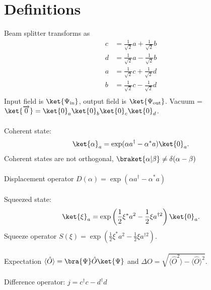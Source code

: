 \cite{Steinlechner2015}
\section{Definitions}
Beam splitter transforms as
\begin{align}
c & = \frac{1}{\sqrt{2}}a + \frac{1}{\sqrt{2}}b\\
d & = \frac{1}{\sqrt{2}}a - \frac{1}{\sqrt{2}}b\\
a &= \frac{1}{\sqrt{2}}c + \frac{1}{\sqrt{2}}d\\
b &= \frac{1}{\sqrt{2}}c - \frac{1}{\sqrt{2}}d\\
\end{align}
Input field is $\ket{\Psi_{\rm{in}}}$, output field is $\ket{\Psi_{\rm{out}}}$. Vacuum = $\ket{\overrightarrow{0}} = \ket{0}_a\ket{0}_b\ket{0}_c\ket{0}_d$. 
\paragraph{}
Coherent state:
\begin{equation}
	\ket{\alpha}_a = \exp(\alpha a^\dagger - \alpha^*a)\ket{0}_a.
\end{equation}
Coherent states are not orthogonal, $\braket{\alpha|\beta} \not= \delta(\alpha-\beta)$
\paragraph{}
Displacement operator $D(\alpha)= \exp\left(\alpha a^\dagger - \alpha^*a\right)$ 
\paragraph{}
Squeezed state:
\begin{equation}
\ket{\xi}_a = \exp\left(\frac{1}{2}\xi^* a^2 - \frac{1}{2}\xi a^{\dagger 2} \right)\ket{0}_a.
\end{equation}
Squeeze operator $S(\xi) = \exp\left(\frac{1}{2}\xi^* a^2 - \frac{1}{2}\xi a^{\dagger 2} \right)$.
\paragraph{}
Expectation $\langle \hat{O} \rangle = \bra{\Psi}\hat{O}\ket{\Psi}$ and $\Delta O = \sqrt{\langle \hat{O}^2 \rangle - \langle \hat{O} \rangle^2}$.
\paragraph{}
Difference operator: $j = c^\dagger c - d^\dagger d $
